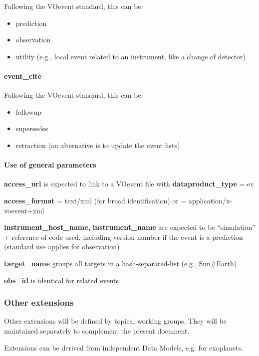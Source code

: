 \documentclass[11pt,a4paper]{ivoa}
\begin{document}
Following the VOevent standard, this can be:

\begin{itemize}
\item prediction
\item observation
\item utility (e.g., local event related to an instrument,
      like a change of detector)
\end{itemize}

\paragraph{event\_cite}

Following the VOevent standard, this can be:

\begin{itemize}
\item followup
\item supersedes
\item retraction (an alternative is to update the event lists)
\end{itemize}

\paragraph{Use of general parameters\textbf{ }}

\textbf{access\_url} is expected to link to a VOevent file with
\textbf{dataproduct\_type} = ev

\textbf{access\_format} = text/xml (for broad identification) or =
application/x-voevent+xml

\textbf{instrument\_host\_name,} \textbf{instrument\_name} are expected
to be ``simulation'' + reference of code used, including version number
if the event is a prediction (standard use applies for observation)

\textbf{target\_name} groups all targets in a hash-separated-list
(e.g., Sun\#Earth)

\textbf{obs\_id} is identical for related events

\subsubsection{Other extensions}

Other extensions will be defined by topical working groups.
They will be maintained separately to complement the present document.

Extensions can be derived from independent Data Models,
e.g. for exoplanets.
\end{document}
